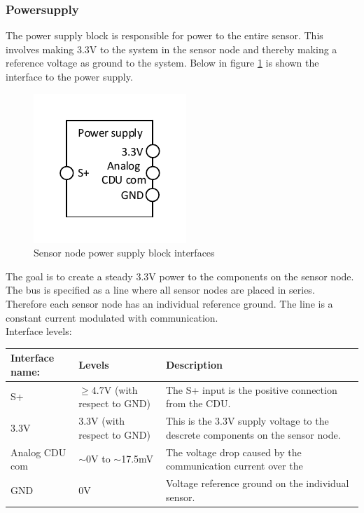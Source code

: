 \subsubsection{Powersupply}
The power supply block is responsible for power to the entire sensor. This involves making 3.3V to the system in the sensor node and thereby making a reference voltage as ground to the system. Below in figure \ref{fig:SN_PS_FIGURE} is shown the interface to the power supply.

\begin{figure}[H]
	\centering
	\includegraphics[width=.4\textwidth]{billeder/sn_powersupply_figure}
	\caption{Sensor node power supply block interfaces}
	\label{fig:SN_PS_FIGURE}
\end{figure} 

The goal is to create a steady 3.3V power to the components on the sensor node. The bus is specified as a line where all sensor nodes are placed in series. Therefore each sensor node has an individual reference ground. The line is a constant current modulated with communication.\\
Interface levels:
\begin{table}[H]
	\centering
	\begin{tabular}{|p{3cm} | p{3cm} | p{5cm}| }
		\hline
		Interface name: & 	Levels 								& Description \\ \hline
		S+ 				& 	$\geq$4.7V (with respect to GND) 	& The S+ input is the positive connection from the CDU. \\ \hline
		3.3V			&	3.3V (with respect to GND)			& This is the 3.3V supply voltage to the descrete components on the sensor node. \\ 	\hline
		Analog CDU com  &   $\sim$0V to $\sim$17.5mV			& The voltage drop caused by the communication current over the \\ \hline
		GND				&	0V									& Voltage reference ground on the individual sensor.\\\hline 
	\end{tabular}
\end{table}


